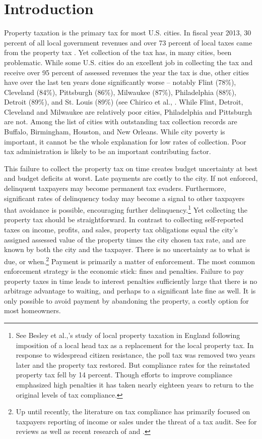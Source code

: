 \documentclass[12pt]{article}
\begin{document}
\newpage

\section{Introduction}

Property taxation is the primary tax for most U.S. cities.  In fiscal
year 2013, 30 percent of all local government revenues and over 73
percent of local taxes came from the property tax
\cite{barnett2013state}.  Yet collection of the tax has, in many
cities, been problematic.  While some U.S. cities do an excellent job
in collecting the tax and receive over 95 percent of assessed revenues
the year the tax is due, other cities have over the last ten years
done significantly worse -- notably Flint (78\%), Cleveland (84\%),
Pittsburgh (86\%), Milwaukee (87\%), Philadelphia (88\%), Detroit
(89\%), and St. Louis (89\%) (see Chirico et al., \citeyear{CILMS-16}.  While Flint, Detroit,
Cleveland and Milwaukee are relatively poor cities, Philadelphia and Pittsburgh are not.
Among the list of cities with outstanding tax collection records are
Buffalo, Birmingham, Houston, and New Orleans.  While city poverty is
important, it cannot be the whole explanation for low rates of
collection.  Poor tax administration is likely to be an important
contributing factor.

This failure to collect the property tax on time creates budget
uncertainty at best and budget deficits at worst. Late payments are costly to the city. If not enforced, delinquent taxpayers may become
permanent tax evaders. Furthermore, significant rates of delinquency today may become
a signal to other taxpayers that avoidance is possible, encouraging further delinquency.\footnote{See Besley et al.,'s \citeyear{besley2015norms} study of local
property taxation in England following imposition of a local head tax as a replacement
for the local property tax. In response to widespread citizen resistance, the poll tax
was removed two years later and the property tax restored. But compliance rates for the
reinstated property tax fell by 14 percent. Though efforts to improve
compliance emphasized high penalties it has taken nearly eighteen years to return to the
original levels of tax compliance.} Yet collecting the
property tax should be straightforward.  In contrast to collecting
self-reported taxes on income, profits, and sales,
property tax obligations equal the city's assigned assessed value
of the property times the city chosen tax rate, and are known by both
the city and the taxpayer.  There is no uncertainty as to what is due,
or when.\footnote{Up until recently, the literature on tax compliance has
  primarily focused on taxpayers reporting of income or sales under the
  threat of a tax audit. See  for reviews as well as
  recent research of  and .}
Payment is primarily a matter of enforcement.  The most common
enforcement strategy is the economic stick: fines and penalties.
Failure to pay property taxes in time leads to interest penalties
sufficiently large that there is no arbitrage advantage to waiting,
and perhaps to a significant late fine as well. It is only possible to
avoid payment by abandoning the property, a costly option for most homeowners.
\end{document}
